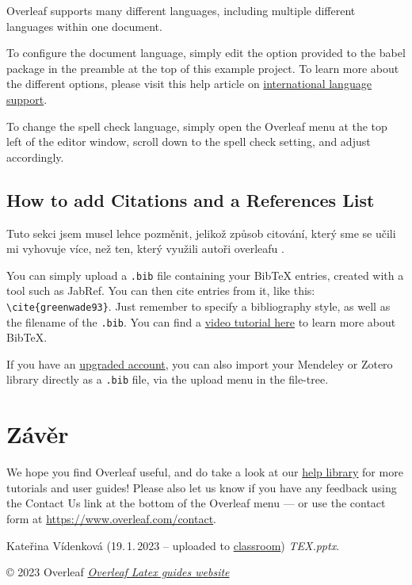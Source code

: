 \documentclass{article}
\begin{document}
Overleaf supports many different languages, including multiple different languages within one document.

To configure the document language, simply edit the option provided to the babel package in the preamble at the top of this example project. To learn more about the different options, please visit this help article on \href{https://www.overleaf.com/learn/latex/International_language_support}{international language support}.

To change the spell check language, simply open the Overleaf menu at the top left of the editor window, scroll down to the spell check setting, and adjust accordingly.

\subsection{How to add Citations and a References List}

Tuto sekci jsem musel lehce pozměnit, jelikož způsob citování, který sme se učili \cite{TEXprezentace} mi vyhovuje více, než ten, který využili autoři overleafu \cite{overleafCite}.

You can simply upload a \verb|.bib| file containing your BibTeX entries, created with a tool such as JabRef. You can then cite entries from it, like this: \verb|\cite{greenwade93}|. Just remember to specify a bibliography style, as well as the filename of the \verb|.bib|. You can find a \href{https://www.overleaf.com/help/97-how-to-include-a-bibliography-using-bibtex}{video tutorial here} to learn more about BibTeX.

If you have an \href{https://www.overleaf.com/user/subscription/plans}{upgraded account}, you can also import your Mendeley or Zotero library directly as a \verb|.bib| file, via the upload menu in the file-tree.

\section{Závěr}

We hope you find Overleaf useful, and do take a look at our \href{https://www.overleaf.com/learn}{help library} for more tutorials and user guides! Please also let us know if you have any feedback using the Contact Us link at the bottom of the Overleaf menu --- or use the contact form at \url{https://www.overleaf.com/contact}.


% 
% 

\begin{thebibliography}{9}
      Kateřina Vídenková (19.\,1.\,2023 -- uploaded to \href{https://classroom.google.com/u/2/c/NTQ2MjU0MzY5NTQx/m/NTg0NDM5MDA1OTIx/details}{classroom}) \emph{TEX.pptx}. 

      © 2023 Overleaf \emph{\href{https://www.overleaf.com/learn/latex/Bibliography_management_with_bibtex}{Overleaf Latex guides website}}
\end{thebibliography}

\listoffigures
\listoftables
\end{document}
